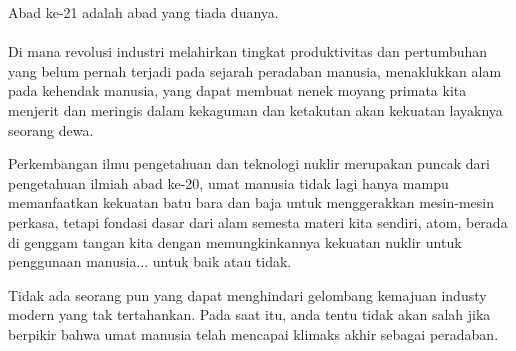 \thispagestyle{plain}

Abad ke-21 adalah abad yang tiada duanya.\\ \\Di mana revolusi industri 
melahirkan tingkat produktivitas dan pertumbuhan yang belum pernah terjadi pada sejarah peradaban manusia,
menaklukkan alam pada kehendak manusia, yang dapat membuat nenek moyang primata kita menjerit dan meringis
dalam kekaguman dan ketakutan akan kekuatan layaknya seorang dewa. 

Perkembangan ilmu pengetahuan dan teknologi nuklir merupakan puncak dari pengetahuan ilmiah abad ke-20,
umat manusia tidak lagi hanya mampu memanfaatkan kekuatan batu bara dan baja untuk menggerakkan mesin-mesin perkasa,
tetapi fondasi dasar dari alam semesta materi kita sendiri, atom, berada di genggam tangan kita dengan memungkinkannya kekuatan nuklir untuk penggunaan manusia... untuk baik atau tidak.

Tidak ada seorang pun yang dapat menghindari gelombang kemajuan industy modern yang tak tertahankan.
Pada saat itu, anda tentu tidak akan salah jika berpikir bahwa umat manusia telah mencapai klimaks akhir sebagai peradaban.



